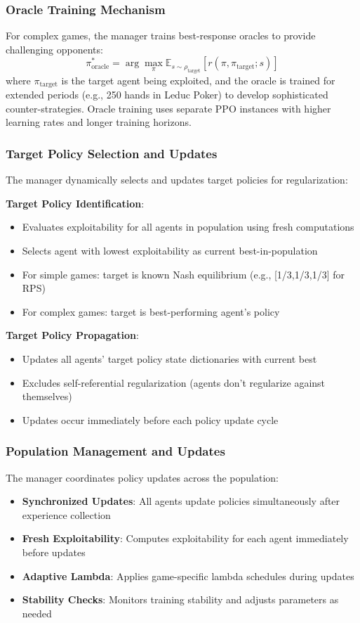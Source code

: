 \documentclass[sigconf,anonymous]{aamas}
\begin{document}
\subsubsection{Oracle Training Mechanism}
For complex games, the manager trains best-response oracles to provide challenging opponents:
\begin{equation}
\pi_{\text{oracle}}^* = \arg\max_{\pi} \mathbb{E}_{s \sim \rho_{\text{target}}} \left[ r(\pi, \pi_{\text{target}}; s) \right]
\end{equation}
where \(\pi_{\text{target}}\) is the target agent being exploited, and the oracle is trained for extended periods (e.g., 250 hands in Leduc Poker) to develop sophisticated counter-strategies. Oracle training uses separate PPO instances with higher learning rates and longer training horizons.

\subsubsection{Target Policy Selection and Updates}
The manager dynamically selects and updates target policies for regularization:

\textbf{Target Policy Identification}:
\begin{itemize}
\item Evaluates exploitability for all agents in population using fresh computations
\item Selects agent with lowest exploitability as current best-in-population
\item For simple games: target is known Nash equilibrium (e.g., [1/3,1/3,1/3] for RPS)
\item For complex games: target is best-performing agent's policy
\end{itemize}

\textbf{Target Policy Propagation}:
\begin{itemize}
\item Updates all agents' target policy state dictionaries with current best
\item Excludes self-referential regularization (agents don't regularize against themselves)
\item Updates occur immediately before each policy update cycle
\end{itemize}

\subsubsection{Population Management and Updates}
The manager coordinates policy updates across the population:
\begin{itemize}
\item \textbf{Synchronized Updates}: All agents update policies simultaneously after experience collection
\item \textbf{Fresh Exploitability}: Computes exploitability for each agent immediately before updates
\item \textbf{Adaptive Lambda}: Applies game-specific lambda schedules during updates
\item \textbf{Stability Checks}: Monitors training stability and adjusts parameters as needed
\end{itemize}
\end{document}
